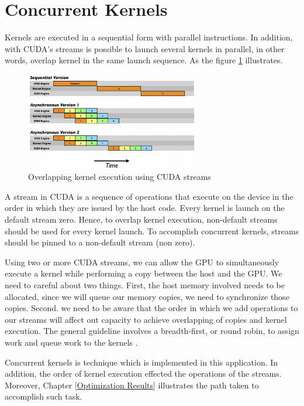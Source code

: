 \section{Concurrent Kernels}

Kernels are executed in a sequential form with parallel instructions. In addition, with CUDA's streams is possible to launch several kernels in parallel, in other words, overlap kernel in the same launch sequence. As the figure \ref{fig:streams} illustrates.

\begin{figure}[htbp]
	\centering
		\includegraphics[width=0.68\textwidth]{Figures/streams.png}
		\smallskip
	\caption[Concurrent Kernels]{Overlapping kernel execution using CUDA streams}
	\label{fig:streams}
\end{figure}

A stream in CUDA is a sequence of operations that execute on the device in the order in which they are issued by the host code. Every kernel is launch on the default stream zero. Hence, to overlap kernel execution, non-default streams should be used for every kernel launch. To accomplish concurrent kernels, streams should be pinned to a non-default stream (non zero)\cite{hwu}. 

Using two or more CUDA streams, we can allow the GPU to simultaneously execute a kernel while performing a copy between the host and the GPU. We need to careful about two things. First, the host memory involved needs to be allocated, since we will queue our memory copies, we need to synchronize those copies. Second. we need to be aware that the order in which we add operations to our streams will affect out capacity to achieve overlapping of copies and kernel execution. The general guideline involves a breadth-first, or round robin, to assign work and queue work to the kernels \cite{example}.

Concurrent kernels is technique which is implemented in this application. In addition, the order of kernel execution effected the operations of the streams. Moreover,  Chapter \ref{Optimization Results} illustrates the path taken to accomplish such task. 

